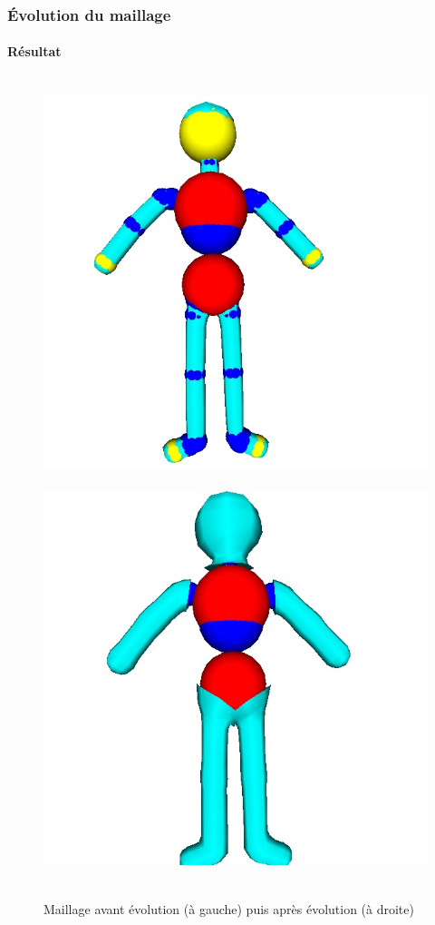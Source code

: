 \documentclass[9pt]{beamer}
\begin{document}
\begin{frame}
	\frametitle{Évolution du maillage}
	\framesubtitle{Résultat}
	
	\begin{figure}[H]
		\centering
		\leavevmode
  		\hbox{
  			\includegraphics[scale=0.3]{images/evolveformer.jpg}
  			\hspace*{0.5cm} 
     		\includegraphics[scale=0.3]{images/meshevolve.jpg}
     		\hspace*{0.5cm}  
  		}
  		\caption{Maillage avant évolution (à gauche) puis après évolution (à droite)}
	\end{figure}
\end{frame}
\end{document}
